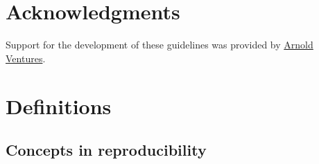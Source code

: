 \documentclass[]{book}
\begin{document}
\hypertarget{acknowledgments}{%
\chapter{Acknowledgments}\label{acknowledgments}}

Support for the development of these guidelines was provided by \href{https://www.arnoldventures.org/}{Arnold Ventures}.

\hypertarget{definitions}{%
\chapter{Definitions}\label{definitions}}

\hypertarget{concepts-in-reproducibility}{%
\section{Concepts in reproducibility}\label{concepts-in-reproducibility}}
\end{document}
